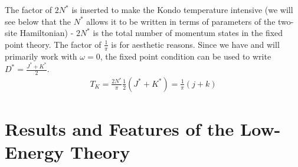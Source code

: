 \documentclass[twoside]{report}
\numberwithin{equation}{section}
\begin{document}
The factor of \(2N^*\) is inserted to make the Kondo temperature intensive (we will see below that the \(N^*\) allows it to  be written in terms of parameters of the two-site Hamiltonian) - \(2N^*\) is the total number of momentum states in the fixed point theory. The factor of \(\frac{1}{\pi}\) is for aesthetic reasons. Since we have and will primarily work with \(\omega=0\), the fixed point condition can be used to write \(D^* = \frac{J^* + K^*}{2}\).
\begin{equation}\begin{aligned}
	T_K = \frac{2N^*}{\pi}\frac{1}{2}\left(J^* + K^*\right) = \frac{1}{\pi}\left(j + k\right)
\end{aligned}\end{equation}

\chapter{Results and Features of the Low-Energy Theory}
\label{results}
\end{document}
